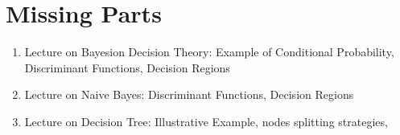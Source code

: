 \chapter{Missing Parts}

\begin{enumerate}
    \item Lecture on Bayesion Decision Theory: Example of Conditional Probability, Discriminant Functions, Decision Regions
    \item Lecture on Naive Bayes: Discriminant Functions, Decision Regions
    \item Lecture on Decision Tree: Illustrative Example, nodes splitting strategies,
\end{enumerate}